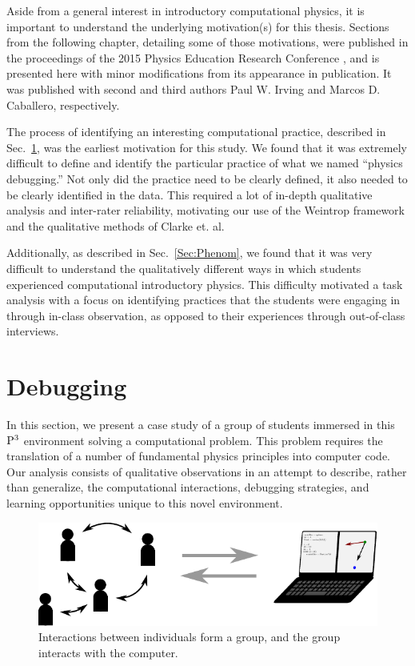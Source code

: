 \documentclass{msuphddissertation}
\begin{document}
\begin{doublespace}
Aside from a general interest in introductory computational physics, it is important to understand the underlying motivation(s) for this thesis.  Sections from the following chapter, detailing some of those motivations, were published in the proceedings of the 2015 Physics Education Research Conference \cite{AAPT2016}, and is presented here with minor modifications from its appearance in publication. It was published with second and third authors Paul W. Irving and Marcos D. Caballero, respectively.

The process of identifying an interesting computational practice, described in Sec.~\ref{Sec:Debug}, was the earliest motivation for this study.  We found that it was extremely difficult to define and identify the particular practice of what we named ``physics debugging.''  Not only did the practice need to be clearly defined, it also needed to be clearly identified in the data.  This required a lot of in-depth qualitative analysis and inter-rater reliability, motivating our use of the Weintrop framework and the qualitative methods of Clarke et. al.

Additionally, as described in Sec.~\ref{Sec:Phenom}, we found that it was very difficult to understand the qualitatively different ways in which students experienced computational introductory physics.  This difficulty motivated a task analysis with a focus on identifying practices that the students were engaging in through in-class observation, as opposed to their experiences through out-of-class interviews.
  
\section{Debugging}\label{Sec:Debug}

In this section, we present a case study of a group of students immersed in this ${\rm P}^{3}$ environment solving a computational problem.  This problem requires the translation of a number of fundamental physics principles into computer code.  Our analysis consists of qualitative observations in an attempt to describe, rather than generalize, the computational interactions, debugging strategies, and learning opportunities unique to this novel environment.

\begin{figure}\centering
\includegraphics[scale=1]{./images/CH4Interactions.pdf}
\caption{Interactions between individuals form a group, and the group interacts with the computer.}\label{CH4:Interactions}
\end{figure}


\end{doublespace}
\end{document}

